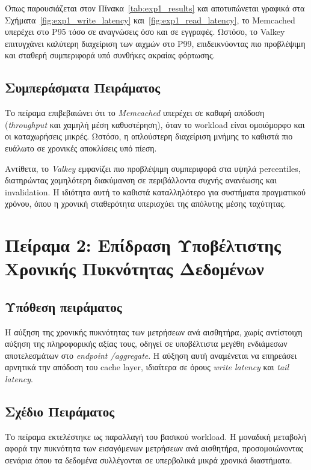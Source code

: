 Όπως παρουσιάζεται στον Πίνακα~\ref{tab:exp1_results}
και
αποτυπώνεται γραφικά στα Σχήματα~\ref{fig:exp1_write_latency}
και~\ref{fig:exp1_read_latency},
το Memcached υπερέχει στο P95 τόσο σε αναγνώσεις όσο και σε εγγραφές. Ωστόσο,
το Valkey επιτυγχάνει καλύτερη διαχείριση των αιχμών στο P99, επιδεικνύοντας
πιο προβλέψιμη και σταθερή συμπεριφορά υπό συνθήκες ακραίας φόρτωσης.

\subsection{Συμπεράσματα Πειράματος}

Το πείραμα επιβεβαιώνει ότι το \textit{Memcached} υπερέχει σε καθαρή απόδοση
(\textit{throughput} και χαμηλή μέση καθυστέρηση), όταν το workload είναι
ομοιόμορφο και οι καταχωρήσεις μικρές. Ωστόσο, η απλούστερη διαχείριση μνήμης το
καθιστά πιο ευάλωτο σε χρονικές αποκλίσεις υπό πίεση.

Αντίθετα, το \textit{Valkey} εμφανίζει πιο προβλέψιμη συμπεριφορά στα υψηλά
percentiles, διατηρώντας χαμηλότερη διακύμανση σε περιβάλλοντα συχνής ανανέωσης
και invalidation. Η ιδιότητα αυτή το καθιστά καταλληλότερο για συστήματα
πραγματικού χρόνου, όπου η χρονική σταθερότητα υπερισχύει της απόλυτης μέσης
ταχύτητας.

\section{Πείραμα 2: Επίδραση Υποβέλτιστης Χρονικής Πυκνότητας Δεδομένων}

\subsection{Υπόθεση πειράματος}

Η αύξηση της χρονικής πυκνότητας των μετρήσεων ανά
αισθητήρα, χωρίς αντίστοιχη αύξηση της πληροφορικής αξίας τους, οδηγεί σε
υποβέλτιστα μεγέθη ενδιάμεσων αποτελεσμάτων στο \textit{endpoint /aggregate}. Η αύξηση
αυτή αναμένεται να επηρεάσει αρνητικά την απόδοση του cache layer, ιδιαίτερα σε
όρους \textit{write latency} και \textit{tail latency}.

\subsection{Σχέδιο Πειράματος}

Το πείραμα εκτελέστηκε ως παραλλαγή του βασικού workload. Η μοναδική μεταβολή
αφορά την πυκνότητα των εισαγόμενων μετρήσεων ανά αισθητήρα, προσομοιώνοντας
σενάρια όπου τα δεδομένα συλλέγονται σε υπερβολικά μικρά χρονικά διαστήματα.


